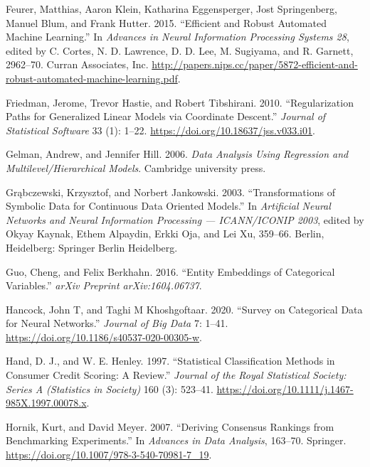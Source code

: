\documentclass[smallextended]{svjour3}       %
\newlength{\cslhangindent}
\newlength{\cslentryspacingunit} %
\newenvironment{CSLReferences}[2] %
 {%
  \setlength{\parindent}{0pt}
  \ifodd #1
  \let\oldpar\par
  \def\par{\hangindent=\cslhangindent\oldpar}
  \fi
  \setlength{\parskip}{#2\cslentryspacingunit}
 }%
 {}
\begin{document}
\begin{CSLReferences}{1}{0}
\leavevmode{}%
Feurer, Matthias, Aaron Klein, Katharina Eggensperger, Jost Springenberg, Manuel Blum, and Frank Hutter. 2015. {``Efficient and Robust Automated Machine Learning.''} In \emph{Advances in Neural Information Processing Systems 28}, edited by C. Cortes, N. D. Lawrence, D. D. Lee, M. Sugiyama, and R. Garnett, 2962--70. Curran Associates, Inc. \url{http://papers.nips.cc/paper/5872-efficient-and-robust-automated-machine-learning.pdf}.

\leavevmode{}%
Friedman, Jerome, Trevor Hastie, and Robert Tibshirani. 2010. {``Regularization Paths for Generalized Linear Models via Coordinate Descent.''} \emph{Journal of Statistical Software} 33 (1): 1--22. \url{https://doi.org/10.18637/jss.v033.i01}.

\leavevmode{}%
Gelman, Andrew, and Jennifer Hill. 2006. \emph{Data Analysis Using Regression and Multilevel/Hierarchical Models}. Cambridge university press.

\leavevmode{}%
Grąbczewski, Krzysztof, and Norbert Jankowski. 2003. {``Transformations of Symbolic Data for Continuous Data Oriented Models.''} In \emph{Artificial Neural Networks and Neural Information Processing --- ICANN/ICONIP 2003}, edited by Okyay Kaynak, Ethem Alpaydin, Erkki Oja, and Lei Xu, 359--66. Berlin, Heidelberg: Springer Berlin Heidelberg.

\leavevmode{}%
Guo, Cheng, and Felix Berkhahn. 2016. {``Entity Embeddings of Categorical Variables.''} \emph{arXiv Preprint arXiv:1604.06737}.

\leavevmode{}%
Hancock, John T, and Taghi M Khoshgoftaar. 2020. {``Survey on Categorical Data for Neural Networks.''} \emph{Journal of Big Data} 7: 1--41. \url{https://doi.org/10.1186/s40537-020-00305-w}.

\leavevmode{}%
Hand, D. J., and W. E. Henley. 1997. {``Statistical Classification Methods in Consumer Credit Scoring: A Review.''} \emph{Journal of the Royal Statistical Society: Series A (Statistics in Society)} 160 (3): 523--41. \url{https://doi.org/10.1111/j.1467-985X.1997.00078.x}.

\leavevmode{}%
Hornik, Kurt, and David Meyer. 2007. {``Deriving Consensus Rankings from Benchmarking Experiments.''} In \emph{Advances in Data Analysis}, 163--70. Springer. \url{https://doi.org/10.1007/978-3-540-70981-7_19}.


\end{CSLReferences}
\end{document}
